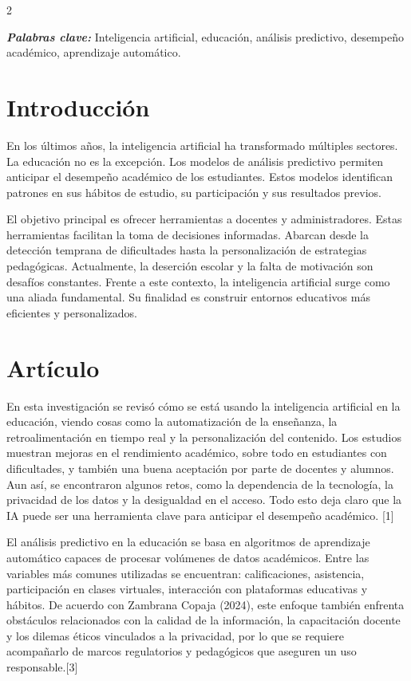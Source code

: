 \documentclass[12pt,spanish,Letterpaper,openany]{book}
\begin{document}
\begin {multicols}{2}

\textbf{\emph{Palabras clave:}} Inteligencia artificial, educación, análisis predictivo, desempeño académico, aprendizaje automático.

\section{Introducción}\label{introducciuxf3n-2}

En los últimos años, la inteligencia artificial ha transformado múltiples sectores. La educación no es la excepción. Los modelos de análisis predictivo permiten anticipar el desempeño académico de los estudiantes. Estos modelos identifican patrones en sus hábitos de estudio, su participación y sus resultados previos.

El objetivo principal es ofrecer herramientas a docentes y administradores. Estas herramientas facilitan la toma de decisiones informadas. Abarcan desde la detección temprana de dificultades hasta la personalización de estrategias pedagógicas. Actualmente, la deserción escolar y la falta de motivación son desafíos constantes. Frente a este contexto, la inteligencia artificial surge como una aliada fundamental. Su finalidad es construir entornos educativos más eficientes y personalizados.

\section{Artículo}\label{artuxedculo-2}

\bigskip

En esta investigación se revisó cómo se está usando la inteligencia artificial en la educación, viendo cosas como la automatización de la enseñanza, la retroalimentación en tiempo real y la personalización del contenido. Los estudios muestran mejoras en el rendimiento académico, sobre todo en estudiantes con dificultades, y también una buena aceptación por parte de docentes y alumnos. Aun así, se encontraron algunos retos, como la dependencia de la tecnología, la privacidad de los datos y la desigualdad en el acceso. Todo esto deja claro que la IA puede ser una herramienta clave para anticipar el desempeño académico. {[}1{]}

El análisis predictivo en la educación se basa en algoritmos de aprendizaje automático capaces de procesar volúmenes de datos académicos. Entre las variables más comunes utilizadas se encuentran: calificaciones, asistencia, participación en clases virtuales, interacción con plataformas educativas y hábitos. De acuerdo con Zambrana Copaja (2024), este enfoque también enfrenta obstáculos relacionados con la calidad de la información, la capacitación docente y los dilemas éticos vinculados a la privacidad, por lo que se requiere acompañarlo de marcos regulatorios y pedagógicos que aseguren un uso responsable.{[}3{]}


\end{multicols}
\end{document}
